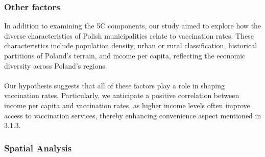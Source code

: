 \documentclass[a4paper,12pt]{article} %
\begin{document}
\subsubsection{Other factors}
In addition to examining the 5C components, our study aimed to explore how the diverse characteristics of Polish municipalities relate to vaccination rates. These characteristics include population density, urban or rural classification, historical partitions of Poland's terrain, and income per capita, reflecting the economic diversity across Poland's regions.
\\
\\
Our hypothesis suggests that all of these factors play a role in shaping vaccination rates. Particularly, we anticipate a positive correlation between income per capita and vaccination rates, as higher income levels often improve access to vaccination services, thereby enhancing convenience aspect mentioned in 3.1.3.
\subsubsection{Spatial Analysis}


\end{document}
